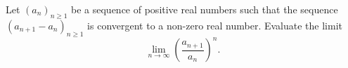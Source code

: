 Let $(a_n)_{n \ge 1}$ be a sequence of positive real numbers such that the sequence $(a_{n+1}-a_n)_{n \ge 1}$ is convergent to a non-zero real number. Evaluate the limit $$ \lim_{n \to \infty} \left( \frac{a_{n+1}}{a_n} \right)^n.$$